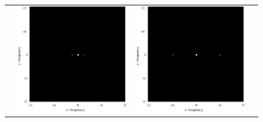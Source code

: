 \begin{figure}[H]
\begin{tabularx}{\textwidth}{p{}CCC}
        \begin{minipage}{.05\textwidth}
            \centering
        \end{minipage}                                                     &
        \begin{minipage}{.25\textwidth}
            \centering
            \includegraphics[keepaspectratio,width=.9\textwidth]{../../Figures/08_14_img4-fft.pdf}
        \end{minipage}  &
        \begin{minipage}{.25\textwidth}
            \centering
            \includegraphics[keepaspectratio,width=.9\textwidth]{../../Figures/08_15_img16-fft.pdf}

\end{minipage}
\end{tabularx}
\end{figure}
